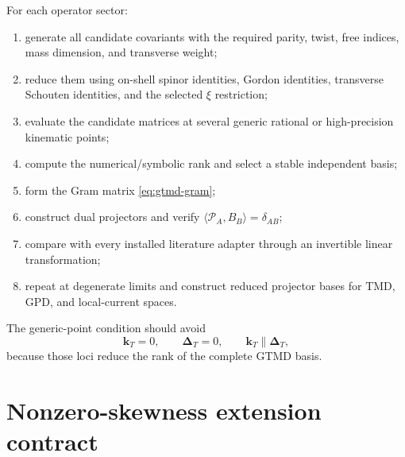\documentclass[11pt]{article}
\newcommand{\kT}{\bm{k}_{T}}
\newcommand{\DT}{\bm{\Delta}_{T}}
\newcommand{\cP}{\mathcal P}
\begin{document}
For each operator sector:
\begin{enumerate}
\item generate all candidate covariants with the required parity, twist,
      free indices, mass dimension, and transverse weight;
\item reduce them using on-shell spinor identities, Gordon identities,
      transverse Schouten identities, and the selected \(\xi\) restriction;
\item evaluate the candidate matrices at several generic rational or
      high-precision kinematic points;
\item compute the numerical/symbolic rank and select a stable independent
      basis;
\item form the Gram matrix \cref{eq:gtmd-gram};
\item construct dual projectors and verify
      \(\langle\cP_A,B_B\rangle=\delta_{AB}\);
\item compare with every installed literature adapter through an invertible
      linear transformation;
\item repeat at degenerate limits and construct reduced projector bases for
      TMD, GPD, and local-current spaces.
\end{enumerate}
The generic-point condition should avoid
\begin{equation}
 \kT=0,
 \qquad
 \DT=0,
 \qquad
 \kT\parallel\DT,
\label{eq:projector-degenerate-points}
\end{equation}
because those loci reduce the rank of the complete GTMD basis.

\section{Nonzero-skewness extension contract}
\label{app:nonzero-xi}
\end{document}
